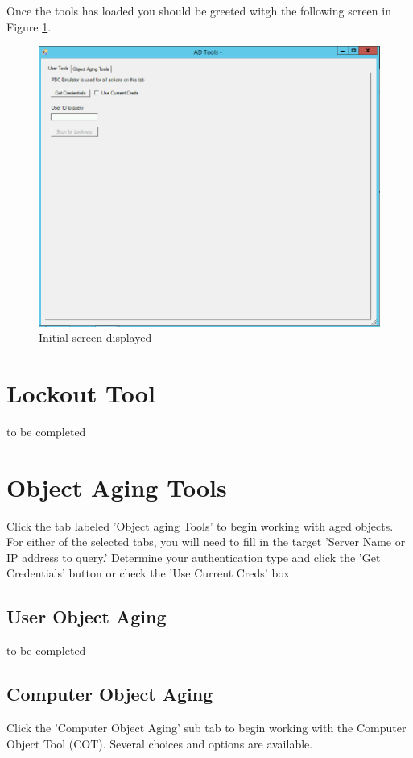 \documentclass[12pt,a4paper,titlepage]{article}
\begin{document}
	Once the tools has loaded you should be greeted witgh the following screen in Figure \ref{fig:open-prog}.
	\begin{figure}[h!]
	\centering
	\includegraphics[width=0.9\linewidth]{open-prog}
	\caption{Initial screen displayed}
	\label{fig:open-prog}
	\end{figure}
	
	\section{Lockout Tool}
	to be completed
	
	\section{Object Aging Tools}
	Click the tab labeled 'Object aging Tools' to begin working with aged objects. For either of the selected tabs, you will need to fill in the target 'Server Name or IP address to query.' Determine your authentication type and click the 'Get Credentials'  button or check the 'Use Current Creds' box. 
	
	
	\subsection{User Object Aging}
	to be completed
	\subsection{Computer Object Aging}
	Click the 'Computer Object Aging' sub tab to begin working with the Computer Object Tool (COT). Several choices and options are available. 
	
\end{document}
